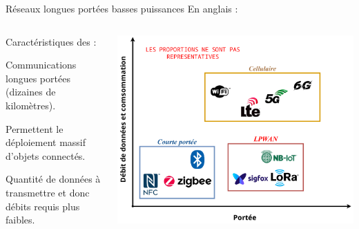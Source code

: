 \documentclass[../main.tex]{subfiles}
\begin{document}
\begin{frame}{Réseaux longues portées basses puissances}
  {En anglais : }

  \begin{columns}
    \begin{column}{.5\linewidth}
      Caractéristiques des  \cite{IEEEStandardLPWAN} :

      \begin{ctrlitemize}{5pt}
        \item Communications longues portées (dizaines de kilomètres).
        \item Permettent le déploiement massif d'objets connectés.
        \item Quantité de données à transmettre et donc débits requis plus faibles.
      \end{ctrlitemize}
    \end{column}
    \begin{column}{.5\linewidth}
      \includegraphics[width=\linewidth, height=.65\textheight, keepaspectratio=true]{figures/drawiopdf/lpwan_and_co.pdf}
    \end{column}
  \end{columns}
\end{frame}
\end{document}
